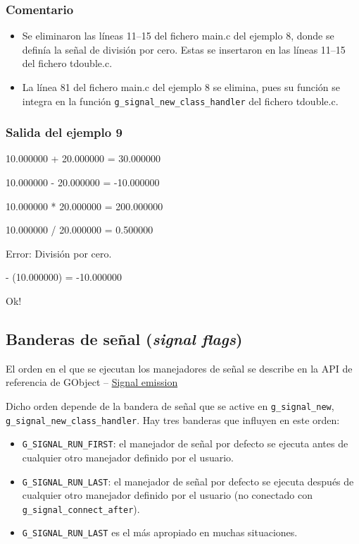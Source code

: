 \subsubsection{Comentario}
\begin{itemize}
\item Se eliminaron las líneas 11--15 del fichero \textsf{main.c} del ejemplo 8,
  donde se definía la señal de división por cero. Estas se insertaron en
  las líneas 11--15 del fichero \textsf{tdouble.c}.
\item La línea 81 del fichero \textsf{main.c} del ejemplo 8 se elimina, pues su
  función se integra en la función \texttt{g\_signal\_new\_class\_handler} del
  fichero \textsf{tdouble.c}.
\end{itemize}

\subsubsection{Salida del ejemplo 9}
10.000000 + 20.000000 = 30.000000\par
10.000000 - 20.000000 = -10.000000\par
10.000000 * 20.000000 = 200.000000\par
10.000000 / 20.000000 = 0.500000\par
\vspace{1ex}
Error: División por cero.\par
\vspace{1ex}
- (10.000000) = -10.000000\par
Ok!\par

\subsection{Banderas de señal (\emph{signal flags})}
El orden en el que se ejecutan los manejadores de señal se describe en la API de
referencia de GObject -- 
\href{https://docs.gtk.org/gobject/concepts.html#signal-emission}{Signal emission}

Dicho orden depende de la bandera de señal que se active en \texttt{g\_signal\_new},
\texttt{g\_signal\_new\_class\_handler}.
Hay tres banderas que influyen en este orden:
\begin{itemize}
  \tightlist
\item \texttt{G\_SIGNAL\_RUN\_FIRST}: el manejador de señal por defecto se ejecuta antes de cualquier otro manejador definido por el usuario.
\item \texttt{G\_SIGNAL\_RUN\_LAST}: el manejador de señal por defecto se ejecuta después de cualquier otro manejador definido por el usuario (no conectado con
  \texttt{g\_signal\_connect\_after}).
\item \texttt{G\_SIGNAL\_RUN\_LAST} es el más apropiado en muchas situaciones.
\end{itemize}

